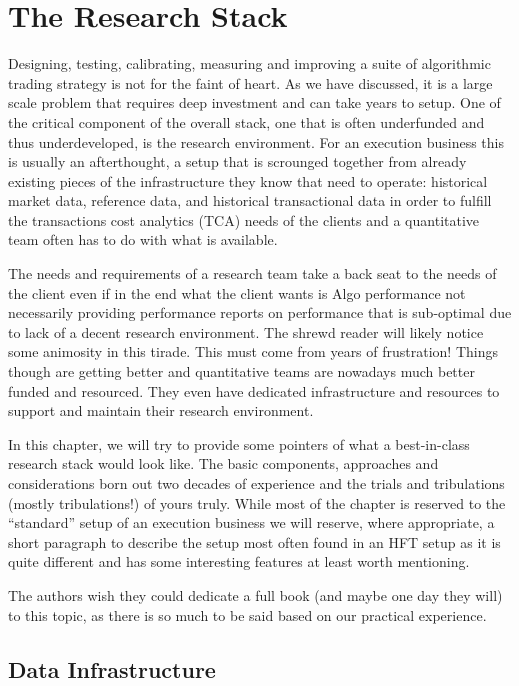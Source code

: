 \chapter{The Research Stack}\label{chap:ch_tech_res}

Designing, testing, calibrating, measuring and improving a suite of algorithmic trading strategy is not for the faint of heart. As we have discussed, it is a large scale problem that requires deep investment and can take years to setup. One of the critical component of the overall stack, one that is often underfunded and thus underdeveloped, is the research environment. For an execution business this is usually an afterthought, a setup that is scrounged together from already existing pieces of the infrastructure they know that need to operate: historical market data, reference data, and historical transactional data in order to fulfill the transactions cost analytics (TCA) needs of the clients and a quantitative team often has to do with what is available.


The needs and requirements of a research team take a back seat to the needs of the client even if in the end what the client wants is Algo performance not necessarily providing performance reports on  performance that is sub-optimal due to lack of a decent research environment. The shrewd reader will likely notice some animosity in this tirade. This must come from years of frustration! Things though are getting better and quantitative teams are nowadays much better funded and resourced. They even have dedicated infrastructure and resources to support and maintain their research environment.


In this chapter, we will try to provide some pointers of what a best-in-class research stack would look like. The basic components, approaches and considerations born out two decades of experience and the trials and tribulations (mostly tribulations!) of yours truly. While most of the chapter is reserved to the ``standard'' setup of an execution business we will reserve, where appropriate, a short paragraph to describe the setup most often found in an HFT setup as it is quite different and has some interesting features at least worth mentioning.


The authors wish they could dedicate a full book (and maybe one day they will) to this topic, as there is so much to be said based on our practical experience. 



\section{Data Infrastructure}

